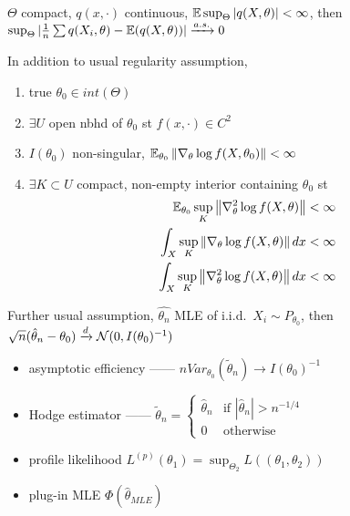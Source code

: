 \begin{thm}
    $\Theta$ compact, $q(x, \cdot)$ continuous, $\mathbb{E}\sup_\Theta|q(X, \theta)| < \infty$, then
    $\sup_\Theta |\frac{1}{n} \sum q(X_i, \theta) - \mathbb{E}(q(X, \theta))| \xrightarrow{a.s.} 0 $
\end{thm}

\begin{assumption}
    In addition to usual regularity assumption,
    \begin{enumerate}
        \item true $\theta_0 \in int(\Theta)$
        \item $\exists U$ open nbhd of $\theta_0$ st $f(x, \cdot) \in C^2$
        \item $I(\theta_0)$ non-singular, $\mathbb{E}_{\theta_0}\left\lVert\nabla_\theta \log f(X, \theta_0)\right\rVert < \infty$
        \item $\exists K \subset U$ compact, non-empty interior containing $\theta_0$ st
        \begin{align*}
            \mathbb{E}_{\theta_0}\sup_K \left\lVert\nabla^2_\theta \log f(X, \theta)\right\rVert < \infty \\
            \int_X \sup_K \left\lVert\nabla_\theta \log f(X, \theta)\right\rVert dx < \infty\\
            \int_X \sup_K \left\lVert\nabla^2_\theta \log f(X, \theta)\right\rVert dx < \infty
        \end{align*}
    \end{enumerate}
\end{assumption}

\begin{thm}
    Further usual assumption, $\hat{\theta_n}$ MLE of i.i.d.\ $X_i \sim P_{\theta_0}$, then\\
    $\sqrt{n}(\hat{\theta}_n - \theta_0) \xrightarrow{d} \mathcal{N}(0, I(\theta_0)^{-1})$
\end{thm}

\begin{itemize}
    \item asymptotic efficiency ------ $n Var_{\theta_0}(\tilde \theta_n) \rightarrow I(\theta_0)^{-1}$
    \item Hodge estimator ------ $\tilde \theta_n = \begin{cases}
                                                        \hat \theta_n & \text{if } |\hat \theta_n| > n^{-1/4}\\
                                                        0 & \text{otherwise}
    \end{cases}$
    \item profile likelihood $L^{(p)}(\theta_1) = \sup_{\Theta_2} L((\theta_1, \theta_2))$
    \item plug-in MLE $\Phi(\hat \theta_{MLE})$
\end{itemize}

